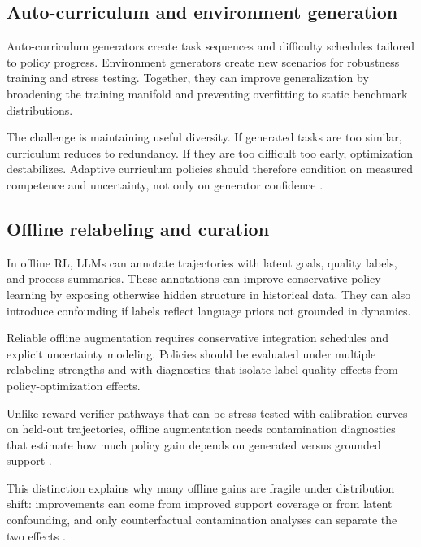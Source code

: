 \documentclass[pdflatex,sn-mathphys-num]{sn-jnl}
\begin{document}
\subsection{Auto-curriculum and environment generation}
Auto-curriculum generators create task sequences and difficulty schedules tailored to policy progress. Environment generators create new scenarios for robustness training and stress testing. Together, they can improve generalization by broadening the training manifold and preventing overfitting to static benchmark distributions.

The challenge is maintaining useful diversity. If generated tasks are too similar, curriculum reduces to redundancy. If they are too difficult too early, optimization destabilizes. Adaptive curriculum policies should therefore condition on measured competence and uncertainty, not only on generator confidence \cite{arxiv_p_2512_24653,arxiv_p_2601_18225,arxiv_p_2601_20802}.

\subsection{Offline relabeling and curation}
In offline RL, LLMs can annotate trajectories with latent goals, quality labels, and process summaries. These annotations can improve conservative policy learning by exposing otherwise hidden structure in historical data. They can also introduce confounding if labels reflect language priors not grounded in dynamics.

Reliable offline augmentation requires conservative integration schedules and explicit uncertainty modeling. Policies should be evaluated under multiple relabeling strengths and with diagnostics that isolate label quality effects from policy-optimization effects.

Unlike reward-verifier pathways that can be stress-tested with calibration curves on held-out trajectories, offline augmentation needs contamination diagnostics that estimate how much policy gain depends on generated versus grounded support \cite{arxiv_p_2602_02137,doi_p_10_14778_3685800_3685913,arxiv_p_2505_18098}.

This distinction explains why many offline gains are fragile under distribution shift: improvements can come from improved support coverage or from latent confounding, and only counterfactual contamination analyses can separate the two effects \cite{arxiv_p_2310_20587,arxiv_p_2601_03205,arxiv_p_2601_14228,arxiv_p_2602_03073}.
\end{document}

